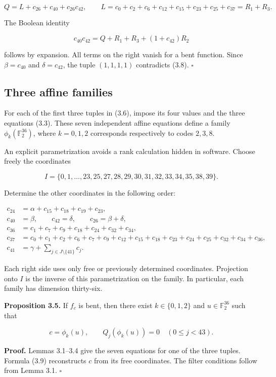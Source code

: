 \documentclass[pdflatex,sn-mathphys-num]{sn-jnl}
\begin{document}
\[
Q=L+c_{26}+c_{40}+c_{26}c_{42},\qquad
L=c_0+c_2+c_6+c_{12}+c_{15}+c_{23}+c_{25}+c_{37}=R_1+R_3.
\]

The Boolean identity

\[
c_{40}c_{42}=Q+R_1+R_3+(1+c_{42})R_2 \tag{3.8}
\]

follows by expansion. All terms on the right vanish for a bent function. Since $\beta=c_{40}$ and $\delta=c_{42}$, the tuple $(1,1,1,1)$ contradicts (3.8). \hfill$\square$

\subsection{Three affine families}\label{subsec:3:4}

For each of the first three tuples in (3.6), impose its four values and the three equations (3.3). These seven independent affine equations define a family $\phi_k(\mathbb F_2^{36})$, where $k=0,1,2$ corresponds respectively to codes $2,3,8$.

An explicit parametrization avoids a rank calculation hidden in software. Choose freely the coordinates

\[
I=\{0,1,\ldots,23,25,27,28,29,30,31,32,33,34,35,38,39\}.
\]

Determine the other coordinates in the following order:

\[
\begin{aligned}
c_{24}&=\alpha+c_{15}+c_{18}+c_{19}+c_{23},\\
c_{40}&=\beta,\qquad c_{42}=\delta,\qquad c_{26}=\beta+\delta,\\
c_{36}&=c_1+c_7+c_9+c_{18}+c_{24}+c_{32}+c_{34},\\
c_{37}&=c_0+c_1+c_2+c_6+c_7+c_9+c_{12}+c_{15}+c_{18}
 +c_{23}+c_{24}+c_{25}+c_{32}+c_{34}+c_{36},\\
c_{41}&=\gamma+\sum_{j\in J\setminus\{41\}}c_j.
\end{aligned} \tag{3.9}
\]

Each right side uses only free or previously determined coordinates. Projection onto $I$ is the inverse of this parametrization on the family. In particular, each family has dimension thirty-six.

\textbf{Proposition 3.5.} If $f_c$ is bent, then there exist $k\in\{0,1,2\}$ and $u\in\mathbb F_2^{36}$ such that

\[
c=\phi_k(u),\qquad Q_j(\phi_k(u))=0\quad(0\le j<43). \tag{3.10}
\]

\textbf{Proof.} Lemmas 3.1--3.4 give the seven equations for one of the three tuples. Formula (3.9) reconstructs $c$ from its free coordinates. The filter conditions follow from Lemma 3.1. \hfill$\square$
\end{document}
